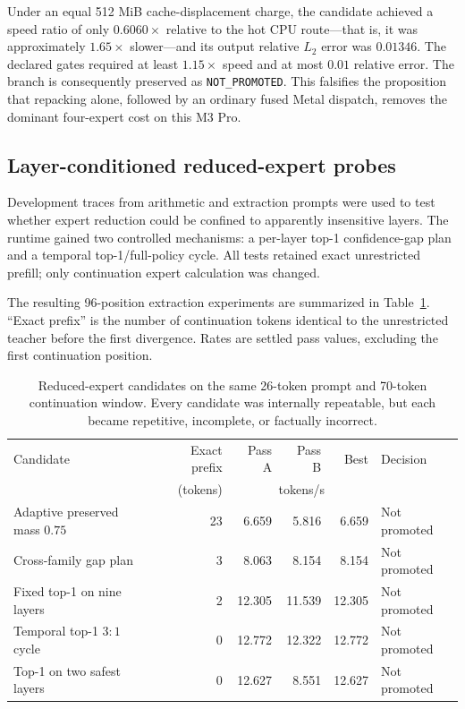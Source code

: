Under an equal 512 MiB cache-displacement charge, the candidate achieved a
speed ratio of only $0.6060\times$ relative to the hot CPU route---that is, it
was approximately $1.65\times$ slower---and its output relative $L_2$ error was
$0.01346$.  The declared gates required at least $1.15\times$ speed and at most
$0.01$ relative error.  The branch is consequently preserved as
\texttt{NOT\_PROMOTED}.  This falsifies the proposition that repacking alone,
followed by an ordinary fused Metal dispatch, removes the dominant four-expert
cost on this M3 Pro.

\subsection{Layer-conditioned reduced-expert probes}

Development traces from arithmetic and extraction prompts were used to test
whether expert reduction could be confined to apparently insensitive layers.
The runtime gained two controlled mechanisms: a per-layer top-1 confidence-gap
plan and a temporal top-1/full-policy cycle.  All tests retained exact
unrestricted prefill; only continuation expert calculation was changed.

The resulting 96-position extraction experiments are summarized in
Table~\ref{tab:gptoss120b-long-candidates}.  ``Exact prefix'' is the number of
continuation tokens identical to the unrestricted teacher before the first
divergence.  Rates are settled pass values, excluding the first continuation
position.

\begin{table}[htbp]
  \centering
  \small
  \begin{tabularx}{\linewidth}{Xrrrrl}
    \toprule
    Candidate & Exact prefix & Pass A & Pass B & Best & Decision \\
              & (tokens) & \multicolumn{3}{c}{tokens/s} & \\
    \midrule
    Adaptive preserved mass $0.75$ & 23 & 6.659 & 5.816 & 6.659 & Not promoted \\
    Cross-family gap plan           & 3  & 8.063 & 8.154 & 8.154 & Not promoted \\
    Fixed top-1 on nine layers      & 2  & 12.305 & 11.539 & 12.305 & Not promoted \\
    Temporal top-1 $3{:}1$ cycle    & 0  & 12.772 & 12.322 & 12.772 & Not promoted \\
    Top-1 on two safest layers      & 0  & 12.627 & 8.551 & 12.627 & Not promoted \\
    \bottomrule
  \end{tabularx}
  \caption{Reduced-expert candidates on the same 26-token prompt and
  70-token continuation window.  Every candidate was internally repeatable,
  but each became repetitive, incomplete, or factually incorrect.}
  \label{tab:gptoss120b-long-candidates}
\end{table}

